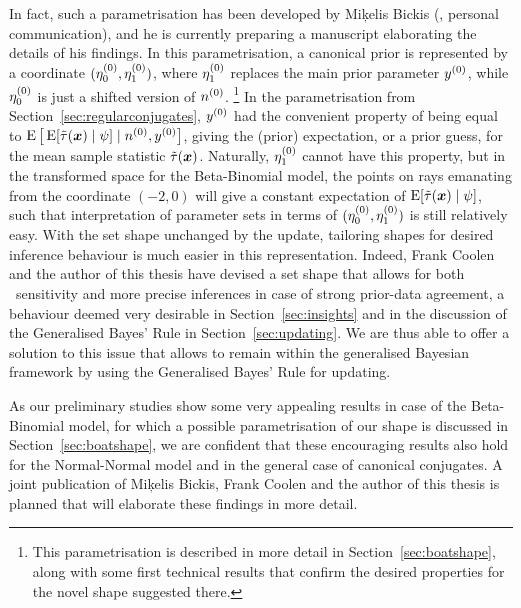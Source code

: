 In fact, such a parametrisation has been developed by Mi\c{k}elis Bickis (\cite*{2011:bickis:geomip}, personal communication),
and he is currently preparing a manuscript elaborating the details of his findings.
In this parametrisation, a canonical prior is represented by a coordinate $(\eta_0^{(0)},\eta_1^{(0)})$,
where $\eta_1^{(0)}$ replaces the main prior parameter $y^{(0)}$,
while $\eta_0^{(0)}$ is just a shifted version of $n^{(0)}$.%
\footnote{This parametrisation is described in more detail in Section~\ref{sec:boatshape},
along with some first technical results that confirm the desired properties for the novel shape suggested there.}
In the parametrisation from Section~\ref{sec:regularconjugates},
$y^{(0)}$ had the convenient property of being equal to $\operatorname{E}\big[\operatorname{E}[\tilde{\tau}({\bm x}) \mid \psi] \mid n^{(0)}, y^{(0)}\big]$,
giving the (prior) expectation, or a prior guess, for the mean sample statistic $\tilde{\tau}({\bm x})$.
Naturally, $\eta_1^{(0)}$ cannot have this property,
but in the transformed space for the Beta-Binomial model, the points on rays emanating from the coordinate $(-2,0)$
will give a constant expectation of $\operatorname{E}[\tilde{\tau}({\bm x}) \mid \psi]$,
such that interpretation of parameter sets in terms of $(\eta_0^{(0)},\eta_1^{(0)})$ is still relatively easy.
With the set shape unchanged by the update, 
tailoring shapes for desired inference behaviour is much easier in this representation.
Indeed, Frank Coolen and the author of this thesis have devised
a set shape %
that allows for both \pdc\ sensitivity
and more precise inferences in case of strong prior-data agreement,
a behaviour deemed very desirable in Section~\ref{sec:insights}
and in the discussion of the Generalised Bayes' Rule in Section~\ref{sec:updating}.
We are thus able to offer a solution to this issue that allows to remain within the generalised Bayesian framework
by using the Generalised Bayes' Rule for updating.

As our preliminary studies show some very appealing results in case of the Beta-Binomial model,
for which a possible parametrisation of our shape is discussed in Section~\ref{sec:boatshape},
we are confident that these encouraging results also hold for the Normal-Normal model
and in the general case of canonical conjugates.
A joint publication of Mi\c{k}elis Bickis, Frank Coolen and the author of this thesis is planned
that will elaborate these findings in more detail.

